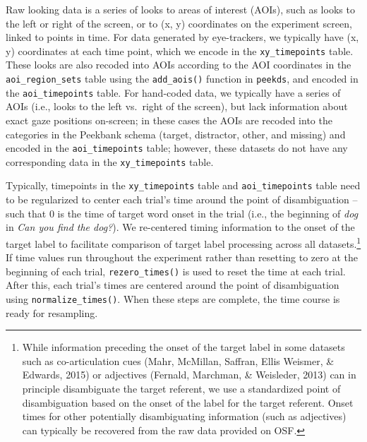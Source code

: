 \documentclass[
  english,
  man,floatsintext]{apa6}
\begin{document}
Raw looking data is a series of looks to areas of interest (AOIs), such as looks to the left or right of the screen, or to (x, y) coordinates on the experiment screen, linked to points in time.
For data generated by eye-trackers, we typically have (x, y) coordinates at each time point, which we encode in the \texttt{xy\_timepoints} table.
These looks are also recoded into AOIs according to the AOI coordinates in the \texttt{aoi\_region\_sets} table using the \texttt{add\_aois()} function in \texttt{peekds}, and encoded in the \texttt{aoi\_timepoints} table.
For hand-coded data, we typically have a series of AOIs (i.e., looks to the left vs.~right of the screen), but lack information about exact gaze positions on-screen; in these cases the AOIs are recoded into the categories in the Peekbank schema (target, distractor, other, and missing) and encoded in the \texttt{aoi\_timepoints} table; however, these datasets do not have any corresponding data in the \texttt{xy\_timepoints} table.

Typically, timepoints in the \texttt{xy\_timepoints} table and \texttt{aoi\_timepoints} table need to be regularized to center each trial's time around the point of disambiguation -- such that 0 is the time of target word onset in the trial (i.e., the beginning of \emph{dog} in \emph{Can you find the dog?}).
We re-centered timing information to the onset of the target label to facilitate comparison of target label processing across all datasets.\footnote{While information preceding the onset of the target label in some datasets such as co-articulation cues (Mahr, McMillan, Saffran, Ellis Weismer, \& Edwards, 2015) or adjectives (Fernald, Marchman, \& Weisleder, 2013) can in principle disambiguate the target referent, we use a standardized point of disambiguation based on the onset of the label for the target referent. Onset times for other potentially disambiguating information (such as adjectives) can typically be recovered from the raw data provided on OSF.}
If time values run throughout the experiment rather than resetting to zero at the beginning of each trial, \texttt{rezero\_times()} is used to reset the time at each trial.
After this, each trial's times are centered around the point of disambiguation using \texttt{normalize\_times()}.
When these steps are complete, the time course is ready for resampling.
\end{document}
